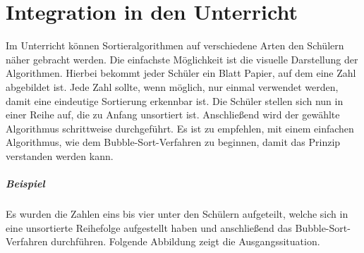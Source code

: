 \documentclass[./entry.tex]{subfiles}
\begin{document}
    \chapter{Integration in den Unterricht}

    Im Unterricht können Sortieralgorithmen auf verschiedene Arten den Schülern näher gebracht werden.
    Die einfachste Möglichkeit ist die visuelle Darstellung der Algorithmen.
    Hierbei bekommt jeder Schüler ein Blatt Papier, auf dem eine Zahl abgebildet ist.
    Jede Zahl sollte, wenn möglich, nur einmal verwendet werden, damit eine eindeutige Sortierung erkennbar ist.
    Die Schüler stellen sich nun in einer Reihe auf, die zu Anfang unsortiert ist.
    Anschließend wird der gewählte Algorithmus schrittweise durchgeführt.
    Es ist zu empfehlen, mit einem einfachen Algorithmus, wie dem \dq Bubble-Sort\dq-Verfahren zu beginnen,
    damit das Prinzip verstanden werden kann.

    \paragraph{Beispiel}
    Es wurden die Zahlen eins bis vier unter den Schülern aufgeteilt, welche sich in eine
    unsortierte Reihefolge aufgestellt haben und anschließend das \dq Bubble-Sort\dq-Verfahren
    durchführen. Folgende Abbildung zeigt die Ausgangssituation.
    \vspace{0.5cm}

\end{document}
